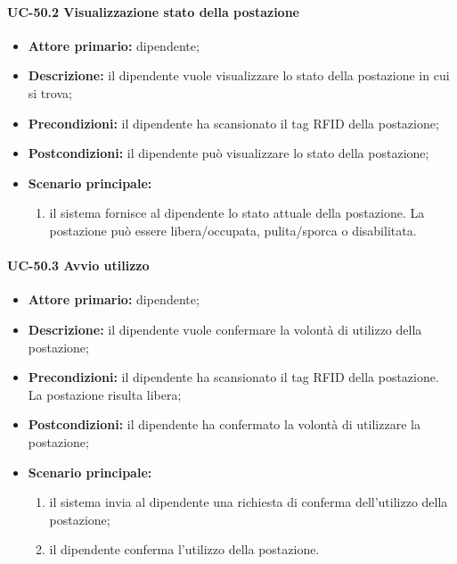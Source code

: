 \paragraph{UC-50.2 Visualizzazione stato della postazione}

\begin{itemize}
    \item \textbf{Attore primario:} dipendente;

    \item \textbf{Descrizione:} il dipendente vuole visualizzare lo stato della postazione in cui si trova;

    \item \textbf{Precondizioni:} il dipendente ha scansionato il tag RFID della postazione;

    \item \textbf{Postcondizioni:} il dipendente può visualizzare lo stato della postazione;

    \item \textbf{Scenario principale:}
        \begin{enumerate}
            \item il sistema fornisce al dipendente lo stato attuale della postazione. La postazione può essere libera/occupata, pulita/sporca o disabilitata.
        \end{enumerate}
\end{itemize}

\paragraph{UC-50.3 Avvio utilizzo}

    \begin{itemize}
        \item \textbf{Attore primario:} dipendente;

        \item \textbf{Descrizione:} il dipendente vuole confermare la volontà di utilizzo della postazione;

        \item \textbf{Precondizioni:} il dipendente ha scansionato il tag RFID della postazione. La postazione risulta libera;

        \item \textbf{Postcondizioni:} il dipendente ha confermato la volontà di utilizzare la postazione;

        \item \textbf{Scenario principale:}
            \begin{enumerate}
                \item il sistema invia al dipendente una richiesta di conferma dell'utilizzo della postazione;
                \item il dipendente conferma l'utilizzo della postazione.
            \end{enumerate}
    \end{itemize}

